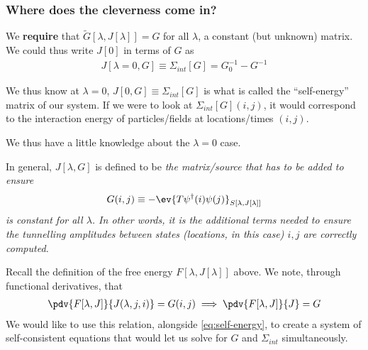 \documentclass{article}
\begin{document}
\subsubsection*{Where does the cleverness come in?}

We \textbf{require} that $\tilde G[\lambda, J[\lambda]] = G$ for all $\lambda$, a constant (but unknown) matrix. We could thus write $J[0]$ in terms of $G$ as
\begin{align}\label{eq:self-energy}
  J[\lambda=0, G] \equiv \Sigma_{int}[G] = G_0^{-1} - G^{-1}
\end{align}

We thus know at $\lambda=0$, $J[0, G] \equiv \Sigma_{int}[G]$ is what is called the ``self-energy'' matrix of our system. If we were to look at $\Sigma_{int}[G](i, j)$, it would correspond to the interaction energy of particles/fields at locations/times $(i, j)$.

We thus have a little knowledge about the $\lambda=0$ case.
\begin{definition*}
  In general, $J[\lambda, G]$ is defined to be \textit{the matrix/source that has to be added to ensure }
  \begin{align*}
    G(i, j) \equiv -\ev{T \psi^\dagger (i) \psi(j)}_{S[\lambda, J[\lambda]]}
  \end{align*}
\textit{is constant for all $\lambda$. In other words, it is the additional terms needed to ensure the tunnelling amplitudes between states (locations, in this case) $i, j$ are correctly computed.} 
\end{definition*}

Recall the definition of the free energy $F[\lambda, J[\lambda]]$ above. We note, through functional derivatives, that
\begin{align*}
  \pdv{F[\lambda, J]}{J( \lambda, j, i)} = G(i, j) \implies \pdv{F[\lambda, J]}{J} = G
\end{align*}
We would like to use this relation, alongside \eqref{eq:self-energy}, to create a system of self-consistent equations that would let us solve for $G$ and $\Sigma_{int}$ simultaneously. 
\end{document}
